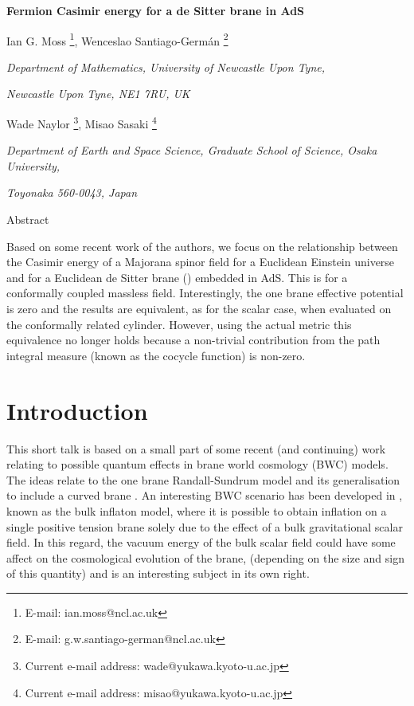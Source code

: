 \documentclass[a4paper,a4paper]{article}
\def\abstract#1{\vskip 7mm 
        \begin{center}{\large Abstract}\par \smallskip
                \begin{minipage}[c]{12cm}
                        \small #1
                \end{minipage}
        \end{center}
}
\def\title#1{\begin{center}{\Large\bf #1}\end{center}}
\def\author#1{\vskip 5mm \begin{center}{#1}\end{center}}
\def\address#1{\begin{center}{\it #1}\end{center}}
\begin{document}
\title{%
Fermion Casimir energy for a de Sitter brane in AdS\myHighlight{$_5$}\coordHE{}}
\author{%
Ian G. Moss \footnote{E-mail: ian.moss@ncl.ac.uk}, 
Wenceslao Santiago-Germ\'{a}n \footnote{E-mail: g.w.santiago-german@ncl.ac.uk}
}
\address{%
  \centerline{\em Department of Mathematics, University of  
Newcastle Upon Tyne,} 
\centerline{\em  Newcastle Upon Tyne, NE1 7RU, UK}
}
\author{%
Wade Naylor \footnote{ Current e-mail address: wade@yukawa.kyoto-u.ac.jp}, 
Misao Sasaki \footnote{Current e-mail address: misao@yukawa.kyoto-u.ac.jp}
}
\address{%
\centerline{\em Department of Earth and Space Science, Graduate 
School of Science, Osaka University,} 
\centerline{\em  Toyonaka 560-0043, Japan} 
}
\abstract{
Based on some recent work of the authors, we focus on the 
relationship between the Casimir energy of a Majorana spinor field for a Euclidean 
Einstein universe \myHighlight{$S^4\times R$}\coordHE{} and for a Euclidean de Sitter brane (\myHighlight{$S^4$}\coordHE{}) 
embedded in AdS\myHighlight{$_5$}\coordHE{}. 
This is for a conformally coupled massless field. 
Interestingly, the one brane effective potential is zero and the results are 
equivalent, as for the scalar case, when evaluated on the conformally related cylinder. 
However, using the actual metric this equivalence no longer holds because a non-trivial 
contribution from the path integral measure (known as the cocycle function) is non-zero.
}
\section{Introduction}

This short talk is based on a small part of some recent (and continuing) work 
\cite{NOZ,NS,ENOO,MNSS} relating to possible quantum effects in brane world 
cosmology (BWC) models.
The ideas relate to the one brane Randall-Sundrum model \cite{RS2} and its 
generalisation to include a curved brane \cite{SMS,GT}.
 An interesting BWC scenario has been developed in \cite{KKS, HIME}, 
known as the bulk inflaton model, where it is possible to obtain
inflation on a single positive tension brane solely due
 to the effect of a  bulk gravitational scalar field. 
In this regard, the vacuum energy of the bulk scalar field
could have some affect on the cosmological evolution of the
brane, (depending on the size and sign of this quantity) and
is an interesting subject in its own right. 
\end{document}
